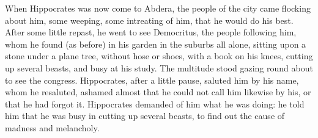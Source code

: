 {When Hippocrates was now come to Abdera, the people of the city came
flocking about him, some weeping, some intreating of him, that he would
do his best. After some little repast, he went to see Democritus, the
people following him, whom he found (as before) in his garden in the
suburbs all alone, sitting upon a stone under a plane tree,
without hose or shoes, with a book on his knees, cutting up several
beasts, and busy at his study. The multitude stood gazing round about
to see the congress. Hippocrates, after a little pause, saluted him by
his name, whom he resaluted, ashamed almost that he could not call him
likewise by his, or that he had forgot it. Hippocrates demanded of him
what he was doing: he told him that he was busy in cutting up
several beasts, to find out the cause of madness and melancholy.

}
